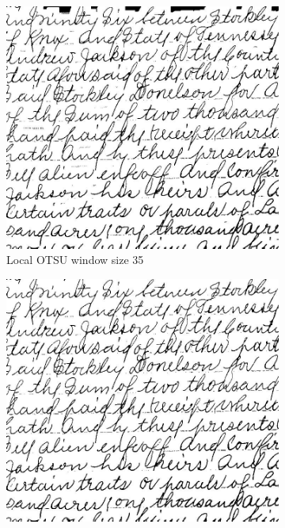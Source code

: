 \documentclass[UTF8]{ctexart}
\begin{document}
\begin{figure}[htbp]
    \begin{subfigure}{0.3\textwidth}
        \centering
        \includegraphics[width=\linewidth]{local_otsu35.jpg}
        \caption{Local OTSU window size 35}
    \end{subfigure}%
    \hfill
    \begin{subfigure}{0.3\textwidth}
        \centering
        \includegraphics[width=\linewidth]{local_otsu65.jpg}

\end{subfigure}
\end{figure}
\end{document}
